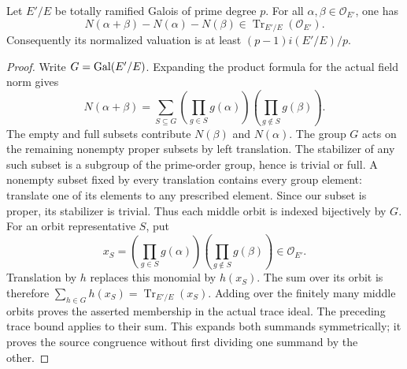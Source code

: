 \begin{lemma}
\label{fw:cyclic-prime-norm-congruence}
\leanok
Let $E'/E$ be totally ramified Galois of prime degree $p$.
For all $\alpha,\beta\in\mathcal O_{E'}$, one has
\[
 N(\alpha+\beta)-N(\alpha)-N(\beta)
   \in\operatorname{Tr}_{E'/E}(\mathcal O_{E'}).
\]
Consequently its normalized valuation is at least
$(p-1)i(E'/E)/p$.
\end{lemma}
\begin{proof}
Write $G=\operatorname{Gal}(E'/E)$. Expanding the product formula for the
actual field norm gives
\[
 N(\alpha+\beta)=
 \sum_{S\subseteq G}
  \left(\prod_{g\in S}g(\alpha)\right)
  \left(\prod_{g\notin S}g(\beta)\right).
\]
The empty and full subsets contribute $N(\beta)$ and $N(\alpha)$.
The group $G$ acts on the remaining nonempty proper subsets by
left translation. The stabilizer of any such subset is a subgroup
of the prime-order group, hence is trivial or full. A nonempty
subset fixed by every translation contains every group element:
translate one of its elements to any prescribed element.
Since our subset is proper, its stabilizer is trivial.
Thus each middle orbit is indexed bijectively by $G$.
For an orbit representative $S$, put
\[
 x_S=\left(\prod_{g\in S}g(\alpha)\right)
     \left(\prod_{g\notin S}g(\beta)\right)\in\mathcal O_{E'}.
\]
Translation by $h$ replaces this monomial by $h(x_S)$.
The sum over its orbit is therefore
$\sum_{h\in G}h(x_S)=\operatorname{Tr}_{E'/E}(x_S)$.
Adding over the finitely many middle orbits proves the asserted
membership in the actual trace ideal. The preceding trace bound
applies to their sum. This expands both summands symmetrically;
it proves the source congruence without first dividing one
summand by the other.
\end{proof}

